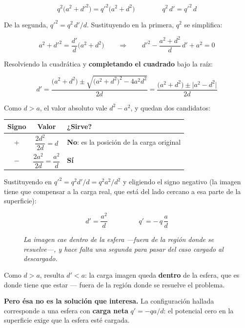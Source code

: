 \documentclass[12pt,a4paper]{article}
\begin{document}
\[
q^2\big(a^2+d'^2\big) = q'^2\big(a^2+d^2\big)
\qquad\qquad
q^2\,d' = q'^2\,d
\]

De la segunda, $q'^2 = q^2\,d'/d$. Sustituyendo en la primera, $q^2$ se
simplifica:

\[
a^2+d'^2 = \frac{d'}{d}\big(a^2+d^2\big)
\qquad\Longrightarrow\qquad
d'^2 - \frac{a^2+d^2}{d}\,d' + a^2 = 0
\]

Resolviendo la cuadrática y \textbf{completando el cuadrado} bajo la raíz:

\[
d' = \frac{\big(a^2+d^2\big) \pm \sqrt{\big(a^2+d^2\big)^2 - 4a^2d^2}}{2d}
= \frac{\big(a^2+d^2\big) \pm \big|a^2-d^2\big|}{2d}
\]

Como $d > a$, el valor absoluto vale $d^2-a^2$, y quedan dos candidatos:

\begin{table}[H]
  \centering
  \begin{tabular}{@{}ccl@{}}
    \toprule
    \textbf{Signo} & \textbf{Valor} & \textbf{¿Sirve?} \\
    \midrule
    $+$ & $\dfrac{2d^2}{2d} = d$ & \textbf{No}: es la posición de la carga original \\[0.7em]
    $-$ & $\dfrac{2a^2}{2d} = \dfrac{a^2}{d}$ & \textbf{Sí} \\
    \bottomrule
  \end{tabular}
\end{table}

Sustituyendo en $q'^2 = q^2 d'/d = q^2 a^2/d^2$ y eligiendo el signo negativo (la
imagen tiene que compensar a la carga real, que está del lado cercano a esa parte
de la superficie):

\[
\boxed{\;d' = \frac{a^2}{d}\;}
\qquad\qquad
\boxed{\;q' = -\,q\,\frac{a}{d}\;}
\]

\begin{figure}[H]
  \centering
  
  \caption*{\small\itshape La imagen cae dentro de la esfera ---fuera de la región
  donde se resuelve---, y hace falta una segunda para pasar del caso cargado al
  descargado.}
\end{figure}

\begin{notebox}[Y es consistente]
Como $d>a$, resulta $d' < a$: la carga imagen queda \textbf{dentro} de la esfera,
que es donde tiene que estar --- fuera de la región donde se resuelve el problema.
\end{notebox}

\textbf{Pero ésa no es la solución que interesa.} La configuración hallada
corresponde a una esfera con \textbf{carga neta} $q' = -qa/d$: el potencial cero en
la superficie exige que la esfera esté cargada.
\end{document}
